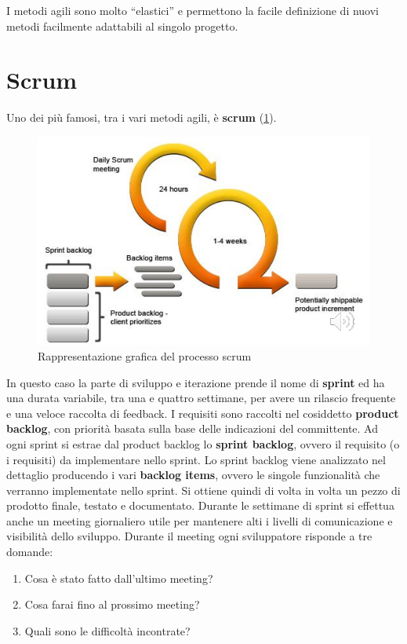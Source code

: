 I metodi agili sono molto “elastici” e permettono la facile definizione di nuovi
metodi facilmente adattabili al singolo progetto.
\section{Scrum}
Uno dei più famosi, tra i vari metodi agili, è \textbf{scrum} (\ref{fig:scrum}).
\begin{figure}[!ht]
      \centering
      \includegraphics[scale=0.5]{img/agili/scrum.png}
      \caption{Rappresentazione grafica del processo scrum}
      \label{fig:scrum}
\end{figure}
In questo caso la parte di sviluppo e iterazione prende il nome di \textbf{sprint}
ed ha una durata variabile, tra una e quattro settimane, per avere un rilascio
frequente e una veloce raccolta di feedback. I requisiti sono raccolti nel cosiddetto
\textbf{product backlog}, con priorità basata sulla base delle indicazioni del
committente. Ad ogni sprint si estrae dal product backlog lo \textbf{sprint backlog},
ovvero il requisito (o i requisiti) da implementare nello sprint. Lo sprint backlog
viene analizzato nel dettaglio producendo i vari \textbf{backlog items}, ovvero
le singole funzionalità che verranno implementate nello sprint. Si ottiene quindi
di volta in volta un pezzo di prodotto finale, testato e documentato. Durante le
settimane di sprint si effettua anche un meeting giornaliero utile per mantenere
alti i livelli di comunicazione e visibilità dello sviluppo. Durante il meeting
ogni sviluppatore risponde a tre domande:
\begin{enumerate}
      \item Cosa è stato fatto dall'ultimo meeting?
      \item Cosa farai fino al prossimo meeting?
      \item Quali sono le difficoltà incontrate?
\end{enumerate}
